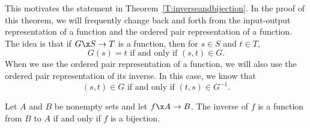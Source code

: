 This motivates the statement in Theorem~\ref{T:inverseandbijection}.  In the proof of this theorem, we will frequently change back and forth from the input-output representation of a function and the ordered pair representation of a function.  The idea is that if  $G\x S \to T$  is a function, then for  
$s \in S$  and  $t \in T$\!,
\[
G( s ) = t  \text{ if and only if }  ( {s, t} ) \in G.
\]
When we use the ordered pair representation of a function, we will also use the ordered pair representation of its inverse.  In this case, we know that
\[
( {s, t} ) \in G\text{ if and only if }( {t, s} ) \in G^{ - 1}. 
\]
%
\begin{theorem} \label{T:inverseandbijection}
Let  $A$  and  $B$  be nonempty sets and let  $f\x A \to B$.  The inverse of  $f$ is a function from  $B$  to  $A$  if and only if  $f$  is a bijection.  
\end{theorem}
%

